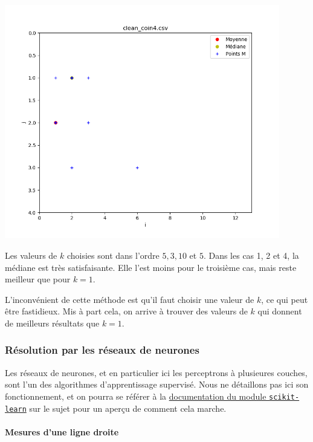 \documentclass[french, a4paper, 12pt, parskip]{scrartcl}
\begin{document}
\begin{center}
  \includegraphics[width=0.9\textwidth]{finger2-f4.png}
\end{center}

Les valeurs de $k$ choisies sont dans l'ordre $5, 3, 10$ et $5$. Dans les cas
1, 2 et 4, la médiane est très satisfaisante. Elle l'est moins pour le
troisième cas, mais reste meilleur que pour $k=1$.

L'inconvénient de cette méthode est qu'il faut choisir une valeur de $k$, ce
qui peut être fastidieux. Mis à part cela, on arrive à trouver des valeurs de
$k$ qui donnent de meilleurs résultats que $k=1$.

\subsubsection{Résolution par les réseaux de neurones}

Les réseaux de neurones, et en particulier ici les perceptrons à plusieures
couches, sont l'un des algorithmes d'apprentissage supervisé. Nous ne
détaillons pas ici son fonctionnement, et on pourra se référer à la
\href{https://scikit-learn.org/stable/modules/neural\_networks\_supervised.html\#multi-layer-perceptron}{documentation
du module \texttt{scikit-learn}} sur le sujet pour un aperçu de comment cela
marche.

\paragraph{Mesures d'une ligne droite}
\end{document}
